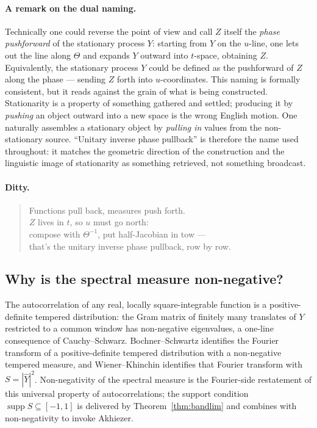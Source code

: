 \documentclass{article}
\newcommand{\tmem}[1]{{\em #1\/}}
\newcommand{\tmop}[1]{\ensuremath{\operatorname{#1}}}
\newenvironment{quoteenv}{\begin{quote} }{\end{quote}}
\newcommand{\supp}{\tmop{supp}}
\begin{document}
\paragraph{A remark on the dual naming.} Technically one could reverse the
point of view and call $Z$ itself the {\tmem{phase pushforward}} of the
stationary process $Y$: starting from $Y$ on the $u$-line, one lets out the
line along $\Theta$ and expands $Y$ outward into $t$-space, obtaining $Z$.
Equivalently, the stationary process $Y$ could be defined as the pushforward
of $Z$ along the phase --- sending $Z$ forth into $u$-coordinates. This naming
is formally consistent, but it reads against the grain of what is being
constructed. Stationarity is a property of something gathered and settled;
producing it by {\tmem{pushing}} an object outward into a new space is the
wrong English motion. One naturally assembles a stationary object by
{\tmem{pulling in}} values from the non-stationary source. ``Unitary inverse
phase pullback'' is therefore the name used throughout: it matches the
geometric direction of the construction and the linguistic image of
stationarity as something retrieved, not something broadcast.

\paragraph{Ditty.}

\begin{quoteenv}
  Functions pull back, measures push forth.\\
  $Z$ lives in $t$, so $u$ must go north:\\
  compose with $\Theta^{- 1}$, put half-Jacobian in tow  ---\\
  that's the unitary inverse phase pullback, row by row.
\end{quoteenv}

\subsection{Why is the spectral measure
non-negative?}\label{app:PSD-colloquial}

The autocorrelation of any real, locally square-integrable function is a
positive-definite tempered distribution: the Gram matrix of finitely many
translates of $Y$ restricted to a common window has non-negative eigenvalues,
a one-line consequence of Cauchy--Schwarz. Bochner--Schwartz identifies the
Fourier transform of a positive-definite tempered distribution with a
non-negative tempered measure, and Wiener--Khinchin identifies that Fourier
transform with $S = | \hat{Y} |^2$. Non-negativity of the spectral measure is
the Fourier-side restatement of this universal property of autocorrelations;
the support condition $\supp S \subseteq [- 1, 1]$ is delivered by
Theorem~\ref{thm:bandlim} and combines with non-negativity to invoke Akhiezer.
\end{document}
